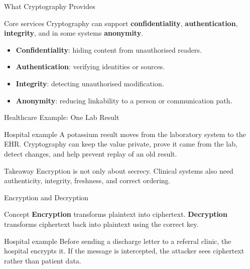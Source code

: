 \documentclass[presentation]{beamer}
\begin{document}
\begin{frame}[c]{What Cryptography Provides}
\begin{block}{Core services}
Cryptography can support \textbf{confidentiality}, \textbf{authentication}, \textbf{integrity}, and in some
systems \textbf{anonymity}.
\end{block}

\begin{itemize}
    \item \textbf{Confidentiality}: hiding content from unauthorised readers.
    \item \textbf{Authentication}: verifying identities or sources.
    \item \textbf{Integrity}: detecting unauthorised modification.
    \item \textbf{Anonymity}: reducing linkability to a person or communication path.
\end{itemize}
\end{frame}

\begin{frame}[c]{Healthcare Example: One Lab Result}
\begin{exampleblock}{Hospital example}
A potassium result moves from the laboratory system to the EHR. Cryptography can keep the value
private, prove it came from the lab, detect changes, and help prevent replay of an old result.
\end{exampleblock}

\begin{block}{Takeaway}
Encryption is not only about secrecy. Clinical systems also need authenticity, integrity, freshness,
and correct ordering.
\end{block}
\end{frame}

\begin{frame}[c]{Encryption and Decryption}
\begin{block}{Concept}
\textbf{Encryption} transforms plaintext into ciphertext. \textbf{Decryption} transforms ciphertext
back into plaintext using the correct key.
\end{block}

\begin{exampleblock}{Hospital example}
Before sending a discharge letter to a referral clinic, the hospital encrypts it. If the message is
intercepted, the attacker sees ciphertext rather than patient data.
\end{exampleblock}
\end{frame}
\end{document}
